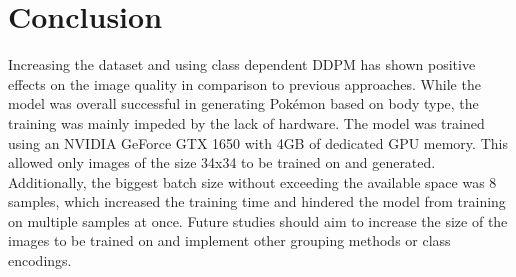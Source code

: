 \documentclass[12pt]{article}
\theoremstyle{plain}
\theoremstyle{definition}
\theoremstyle{remark}
\begin{document}
\section{Conclusion}
\label{sec:conclusion}
Increasing the dataset and using class dependent \ac{DDPM} has shown positive effects on the image quality in comparison to previous approaches. 
While the model was overall successful in generating Pokémon based on body type, the training was mainly impeded by the lack of hardware. The model was trained using an NVIDIA GeForce GTX 1650 with 4GB of dedicated GPU memory. This allowed only images of the size 34x34 to be trained on and generated. Additionally, the biggest batch size without exceeding the available space was 8 samples, which increased the training time and hindered the model from training on multiple samples at once. Future studies should aim to increase the size of the images to be trained on and implement other grouping methods or class encodings.

%
%
\newpage
\printbibliography[heading=bibintoc]
\end{document}
